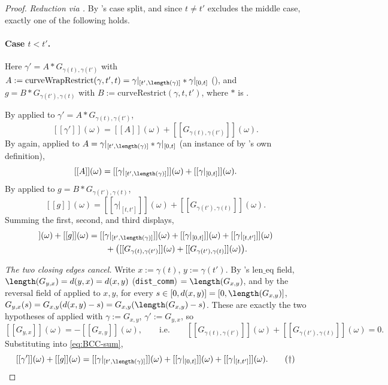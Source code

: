\begin{proof}
  \emph{Reduction via .} By 's case split, and since $t \ne t'$
  excludes the middle case, exactly one of the following holds.

  \paragraph{Case $t < t'$.} Here $\gamma' = A * G_{\gamma(t),\gamma(t')}$ with $A :=
  \mathrm{curveWrapRestrict}(\gamma,t',t) = \gamma|_{[t',\length(\gamma)]} * \gamma|_{[0,t]}$
  (), and $g = B * G_{\gamma(t'),\gamma(t)}$ with $B :=
  \mathrm{curveRestrict}(\gamma,t,t')$, where $*$ is .

  By  applied to $\gamma' = A * G_{\gamma(t),\gamma(t')}$,
  \[
    [[\gamma']](\omega) = [[A]](\omega) + [[G_{\gamma(t),\gamma(t')}]](\omega)
    .
  \]
  By  again, applied to $A = \gamma|_{[t',\length(\gamma)]} *
  \gamma|_{[0,t]}$ (an instance of  by 's own
  definition),
  \[
    [[A]](\omega) = [[\gamma|_{[t',\length(\gamma)]}]](\omega) + [[\gamma|_{[0,t]}]](\omega)
    .
  \]
  By  applied to $g = B * G_{\gamma(t'),\gamma(t)}$,
  \[
    [[g]](\omega) = [[\gamma|_{[t,t']}]](\omega) + [[G_{\gamma(t'),\gamma(t)}]](\omega)
    .
  \]
  Summing the first, second, and third displays,
  \begin{align}
    [[\gamma']](\omega) + [[g]](\omega)
    &= [[\gamma|_{[t',\length(\gamma)]}]](\omega) + [[\gamma|_{[0,t]}]](\omega) +
       [[\gamma|_{[t,t']}]](\omega) \notag \\
    &\qquad + \bigl([[G_{\gamma(t),\gamma(t')}]](\omega) + [[G_{\gamma(t'),\gamma(t)}]](\omega)\bigr)
    . \label{eq:BCC-sum}
  \end{align}

  \emph{The two closing edges cancel.} Write $x:=\gamma(t)$, $y:=\gamma(t')$. By
  's $\mathrm{len\_eq}$ field, $\length(G_{y,x}) = d(y,x) = d(x,y)$
  (\texttt{dist\_comm}) $=\length(G_{x,y})$, and by the $\mathrm{reversal}$ field of
   applied to $x,y$, for every $s \in [0,d(x,y)] = [0,\length(G_{x,y})]$,
  $G_{y,x}(s) = G_{x,y}(d(x,y)-s) = G_{x,y}(\length(G_{x,y})-s)$. These are exactly the two
  hypotheses of  applied with $\gamma := G_{x,y}$, $\gamma' := G_{y,x}$, so
  \[
    [[G_{y,x}]](\omega) = -[[G_{x,y}]](\omega)
    , \qquad \text{i.e.} \qquad
    [[G_{\gamma(t),\gamma(t')}]](\omega) + [[G_{\gamma(t'),\gamma(t)}]](\omega) = 0
    .
  \]
  Substituting into \eqref{eq:BCC-sum},
  \[
    [[\gamma']](\omega) + [[g]](\omega) = [[\gamma|_{[t',\length(\gamma)]}]](\omega) +
      [[\gamma|_{[0,t]}]](\omega) + [[\gamma|_{[t,t']}]](\omega)
    . \tag{$\dagger$}
  \]


\end{proof}
